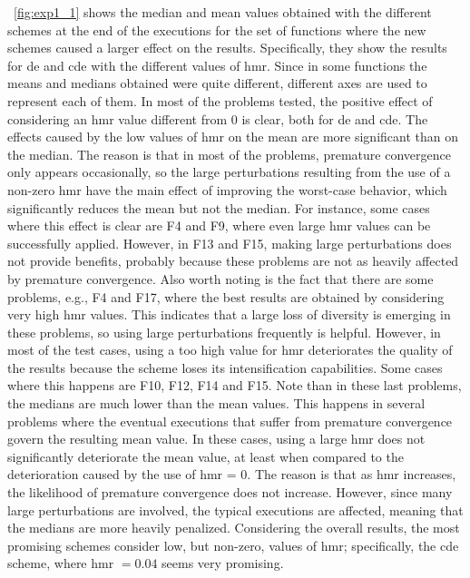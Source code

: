 \documentclass[review,3p]{elsarticle}
\newcommand{\CDE}{c{\sc de}}
\newcommand{\DE}{{\sc de}}
\newcommand{\HMR}{{\sc hmr}}
\begin{document}
\figurename~\ref{fig:exp1_1} shows the median and mean values obtained with the different schemes at the end of the executions for the set of functions
where the new schemes caused a larger effect on the results.
%
Specifically, they show the results for \DE{} and \CDE{} with the different values of \HMR{}.
%
Since in some functions the means and medians obtained were quite different, different axes are used
to represent each of them.
%
In most of the problems tested, the positive effect of considering
an \HMR{} value different from 0 is clear, both for \DE{} and \CDE{}.
%
The effects caused by the low values of \HMR{} on the mean are more significant than on the median.
%
The reason is that in most of the problems, premature convergence only appears occasionally, so the large perturbations resulting from
the use of a non-zero \HMR{} have the main effect of improving the worst-case behavior, which significantly reduces the mean but not the median.
%
For instance, some cases where this effect is clear are F4 and F9, where even large \HMR{} values can be successfully applied.
%
However, in F13 and F15, making large perturbations does not provide benefits, probably because these problems are not as heavily affected by premature convergence.
%
Also worth noting is the fact that there are some problems, e.g., F4 and F17, where the best results are obtained by considering very high \HMR{}
values.
%
This indicates that a large loss of diversity is emerging in these problems, so using large perturbations frequently is helpful.
%
However, in most of the test cases, using a too high value for \HMR{} deteriorates the quality of the results
because the scheme loses its intensification capabilities.
%
Some cases where this happens are F10, F12, F14 and F15.
%
Note than in these last problems, the medians are much lower than the mean values.
%
This happens in several problems where the eventual executions that suffer from premature convergence govern the resulting mean value.
%
In these cases, using a large \HMR{} does not significantly deteriorate the mean value, at least when compared to the deterioration
caused by the use of \HMR{} = 0.
%
The reason is that as \HMR{} increases, the likelihood of premature convergence does not increase.
%
However, since many large perturbations are involved, the typical executions are affected, meaning that the medians are more heavily penalized.
%
Considering the overall results, the most promising schemes consider low, but non-zero, values of \HMR{}; specifically, the \CDE{} scheme, where \HMR{} $ = 0.04$ seems very promising.
\end{document}
